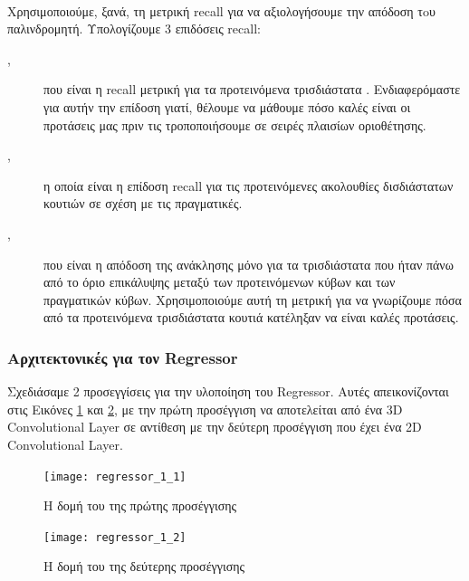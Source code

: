 \paragraph{}
Χρησιμοποιούμε, ξανά, τη μετρική \en recall \gr για να αξιολογήσουμε την απόδοση τoυ παλινδρομητή. Υπολογίζουμε 3 επιδόσεις \en recall\gr:
\begin{description}
\item [,] που είναι η \en recall \gr μετρική για τα προτεινόμενα τρισδιάστατα . Ενδιαφερόμαστε για αυτήν την επίδοση γιατί,
  θέλουμε να μάθουμε πόσο καλές είναι οι προτάσεις μας πριν τις τροποποιήσουμε σε σειρές πλαισίων οριοθέτησης.
\item [,] η οποία είναι η επίδοση \en recall \gr για τις προτεινόμενες ακολουθίες δισδιάστατων κουτιών σε σχέση με τις πραγματικές.
\item[,] που είναι η απόδοση της ανάκλησης μόνο για τα τρισδιάστατα  που ήταν πάνω από το όριο επικάλυψης μεταξύ
  των προτεινόμενων κύβων και των πραγματικών κύβων. Χρησιμοποιούμε αυτή τη μετρική για να γνωρίζουμε πόσα από τα προτεινόμενα τρισδιάστατα κουτιά
  κατέληξαν να είναι καλές προτάσεις.
\end{description}


\subsubsection{Αρχιτεκτονικές για τον \en Regressor \gr} 
Σχεδιάσαμε 2 προσεγγίσεις για την υλοποίηση του \en Regressor\gr. Aυτές απεικονίζονται στις Εικόνες \ref{fig:gr_regressor_3d} και \ref{fig:gr_reg_1_2}, με την πρώτη προσέγγιση
να αποτελείται από ένα \en 3D Convolutional Layer \gr σε αντίθεση με την δεύτερη προσέγγιση που έχει ένα \en 2D Convolutional Layer\gr.

\en
\begin{figure}[h]
  \centering
  \texttt{[image: regressor\_1\_1]}
  \caption{\gr Η δομή του  της πρώτης προσέγγισης}
  \label{fig:gr_regressor_3d}
\end{figure}
\gr
\en
\begin{figure}[h]
  \en
  \centering
  \texttt{[image: regressor\_1\_2]}
  \caption{\gr Η δομή του  της δεύτερης προσέγγισης}
  \label{fig:gr_reg_1_2}
\end{figure}
\gr

